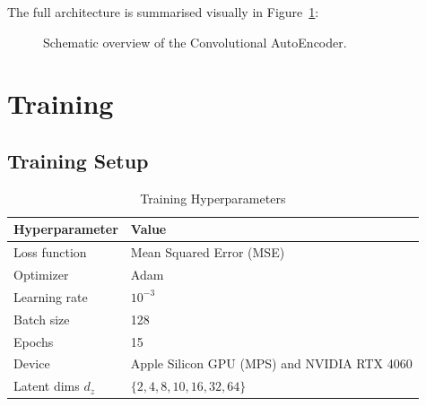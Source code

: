 \documentclass[12pt,a4paper]{article}
\begin{document}
The full architecture is summarised visually in Figure~\ref{fig:architecture}:

\begin{figure}[H]
  \centering
  \caption{Schematic overview of the Convolutional AutoEncoder.}
  \label{fig:architecture}
\end{figure}

\section{Training}

\subsection{Training Setup}

\begin{table}[H]
  \centering
  \caption{Training Hyperparameters}
  \label{tab:hyperparams}
  \renewcommand{\arraystretch}{1.3}
  \begin{tabular}{ll}
    \toprule
    \textbf{Hyperparameter} & \textbf{Value} \\
    \midrule
    Loss function    & Mean Squared Error (MSE) \\
    Optimizer        & Adam \\
    Learning rate    & $10^{-3}$ \\
    Batch size       & 128 \\
    Epochs           & 15 \\
    Device           & Apple Silicon GPU (MPS) and NVIDIA RTX 4060 \\
    Latent dims $d_z$& $\{2, 4, 8, 10, 16, 32, 64\}$ \\
    \bottomrule
  \end{tabular}
\end{table}
\end{document}
